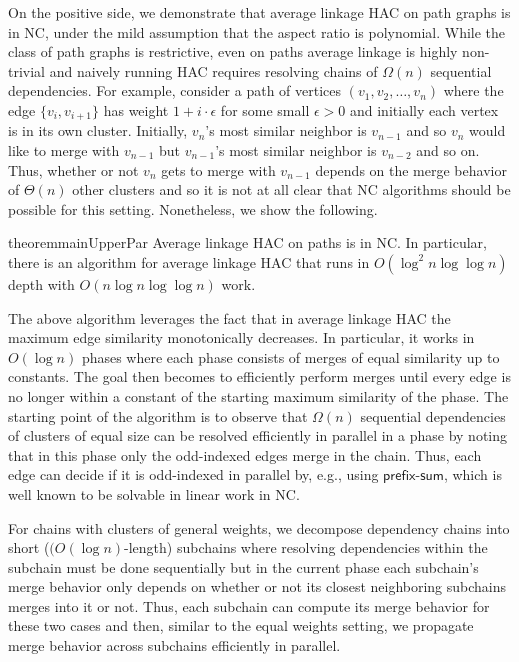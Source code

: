 \documentclass[11pt]{article}
\newcommand{\NC}{\textsc{NC}\xspace}
\begin{document}
On the positive side, we demonstrate that average linkage HAC on path graphs is in \NC, under the mild assumption that the aspect ratio is polynomial.
While the class of path graphs is restrictive, even on paths average linkage is highly non-trivial and naively running HAC requires resolving chains of $\Omega(n)$ sequential dependencies. For example, consider a path of vertices $(v_1, v_2, \ldots, v_n)$ where the edge $\{v_{i}, v_{i+1}\}$ has weight $1+i \cdot \epsilon$ for some small $\epsilon > 0$ and initially each vertex is in its own cluster. Initially, $v_n$'s most similar neighbor is $v_{n-1}$ and so $v_n$ would like to merge with $v_{n-1}$ but $v_{n-1}$'s most similar neighbor is $v_{n-2}$ and so on. Thus, whether or not $v_n$ gets to merge with $v_{n-1}$ depends on the merge behavior of $\Theta(n)$ other clusters and so it is not at all clear that \NC algorithms should be possible for this setting. Nonetheless, we show the following.

\begin{restatable}{theorem}{mainUpperPar}\label{thm:mainUpperPar}
    Average linkage HAC on paths is in \NC. In particular, there is an algorithm for average linkage HAC that runs in $O(\log^2 n \log\log n)$ depth with $O(n\log n\log\log n)$ work.
\end{restatable}

\noindent  The above algorithm leverages the fact that in average linkage HAC the maximum edge similarity monotonically decreases. In particular, it works in $O(\log n)$ phases where each phase consists of merges of equal similarity up to constants. The goal then becomes to efficiently perform merges until every edge is no longer within a constant of the starting maximum similarity of the phase. The starting point of the algorithm is to observe that $\Omega(n)$ sequential dependencies of clusters of equal size can be resolved efficiently in parallel in a phase by noting that in this phase only the odd-indexed edges merge in the chain. Thus, each edge can decide if it is odd-indexed in parallel by, e.g., using $\mathsf{prefix\text{-}sum}$, which is well known to be solvable in linear work in \NC.

For chains with clusters of general weights, we decompose dependency chains into short ($(O(\log n)$-length) subchains where resolving dependencies within the subchain must be done sequentially but in the current phase each subchain's merge behavior only depends on whether or not its closest neighboring subchains merges into it or not. Thus, each subchain can compute its merge behavior for these two cases and then, similar to the equal weights setting, we propagate merge behavior across subchains efficiently in parallel.
\end{document}
